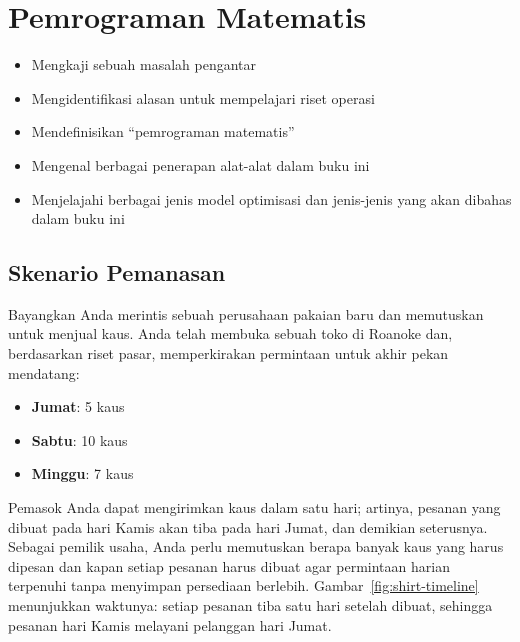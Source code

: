 

%

\chapter{Pemrograman Matematis}

\begin{outcome}
\begin{itemize}
\item Mengkaji sebuah masalah pengantar
\item Mengidentifikasi alasan untuk mempelajari riset operasi
\item Mendefinisikan ``pemrograman matematis''
\item Mengenal berbagai penerapan alat-alat dalam buku ini
\item Menjelajahi berbagai jenis model optimisasi dan jenis-jenis yang akan dibahas dalam buku ini
\end{itemize}
\end{outcome}
\section{Skenario Pemanasan}
\label{sec:shirt-warmup}

Bayangkan Anda merintis sebuah perusahaan pakaian baru dan memutuskan untuk menjual kaus. Anda telah membuka sebuah toko di Roanoke dan, berdasarkan riset pasar, memperkirakan permintaan untuk akhir pekan mendatang:

\begin{itemize}
    \item \textbf{Jumat}: 5 kaus  
    \item \textbf{Sabtu}: 10 kaus  
    \item \textbf{Minggu}: 7 kaus  
\end{itemize}

Pemasok Anda dapat mengirimkan kaus dalam satu hari; artinya, pesanan yang dibuat pada hari Kamis akan tiba pada hari Jumat, dan demikian seterusnya. Sebagai pemilik usaha, Anda perlu memutuskan berapa banyak kaus yang harus dipesan dan kapan setiap pesanan harus dibuat agar permintaan harian terpenuhi tanpa menyimpan persediaan berlebih. Gambar~\ref{fig:shirt-timeline} menunjukkan waktunya: setiap pesanan tiba satu hari setelah dibuat, sehingga pesanan hari Kamis melayani pelanggan hari Jumat.

